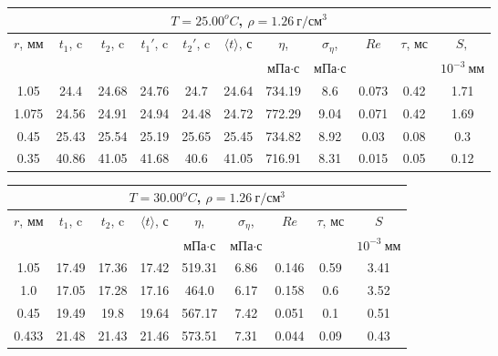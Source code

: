 \documentclass[12pt,a4paper]{article}
\begin{document}
\begin{table}[htp]
    \centering

    \begin{tabular}[]{|c|c|c|c|c|c|c|c|c|c|c|}
        \hline
        \multicolumn{11}{|c|}{$T = 25.00^oC$, $\rho = 1.26\ г/см^3$}\\
        \hline
        $r$, мм & $t_1$, c & $t_2$, c & $t_1'$, c & $t_2'$, c & $\langle t\rangle $, с & $\eta$,& $\sigma_{\eta}$,& $Re$ & $\tau$, мс & $S,$\\
        &&&&&& мПа$\cdot$с & мПа$\cdot$с &&&$10^{-3}\ мм$\\
        \hline
        1.05  &  24.4 & 24.68 & 24.76 & 24.7 &  24.64  &  734.19  &  8.6  &  0.073  &  0.42  &  1.71 \\ 
        \hline
        1.075  &  24.56 & 24.91 & 24.94 & 24.48 &  24.72  &  772.29  &  9.04  &  0.071  &  0.42  &  1.69 \\ 
        \hline
        0.45  &  25.43 & 25.54 & 25.19 & 25.65 &  25.45  &  734.82  &  8.92  &  0.03  &  0.08  &  0.3 \\ 
        \hline
        0.35  &  40.86 & 41.05 & 41.68 & 40.6 &  41.05  &  716.91  &  8.31  &  0.015  &  0.05  &  0.12 \\ 
        \hline

    \end{tabular}

    \begin{tabular}[]{|c|c|c|c|c|c|c|c|c|}
        \hline
        \multicolumn{9}{|c|}{$T = 30.00^oC$, $\rho = 1.26\ г/см^3$}\\
        \hline
        $r$, мм & $t_1$, c & $t_2$, c & $\langle t\rangle $, с & $\eta$,& $\sigma_{\eta}$,& $Re$ & $\tau$, мс & $S$\\
        &&&& мПа$\cdot$с & мПа$\cdot$с &&&$10^{-3}\ мм$\\
        \hline
        1.05  &  17.49 & 17.36 &  17.42  &  519.31  &  6.86  &  0.146  &  0.59  &  3.41 \\ 
        \hline
        1.0  &  17.05 & 17.28 &  17.16  &  464.0  &  6.17  &  0.158  &  0.6  &  3.52 \\ 
        \hline
        0.45  &  19.49 & 19.8 &  19.64  &  567.17  &  7.42  &  0.051  &  0.1  &  0.51 \\ 
        \hline
        0.433  &  21.48 & 21.43 &  21.46  &  573.51  &  7.31  &  0.044  &  0.09  &  0.43 \\ 
        \hline
    

\end{tabular}
\end{table}
\end{document}
